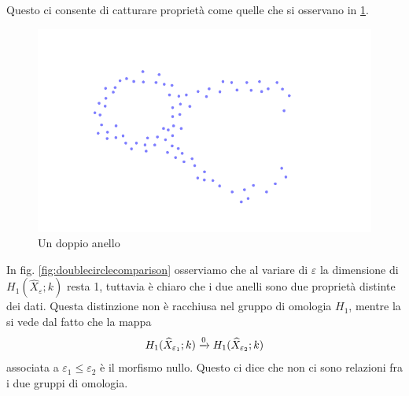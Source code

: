 Questo ci consente di catturare proprietà come quelle che si osservano in \cref{fig:doublecircle}.

\begin{figure}[ht]
  \begin{center}
    \includegraphics{gfx/double_circle_small.pdf}
    \caption{Un doppio anello}
    \label{fig:doublecircle}
  \end{center}
\end{figure}

In fig. \ref{fig:doublecirclecomparison} osserviamo che al variare di $\varepsilon$ la dimensione di $H_1(\widehat{X}_\varepsilon;k)$ resta 1, tuttavia è chiaro che i due anelli sono due proprietà distinte dei dati. Questa distinzione non è racchiusa nel gruppo di omologia $H_1$, mentre la si vede dal fatto che la mappa
\begin{equation*}
H_1(\widehat{X}_{\varepsilon_1};k)\xrightarrow{0}H_1(\widehat{X}_{\varepsilon_2};k)
\end{equation*}
associata a $\varepsilon_1\leq\varepsilon_2$ è il morfismo nullo. Questo ci dice che non ci sono relazioni fra i due gruppi di omologia.

